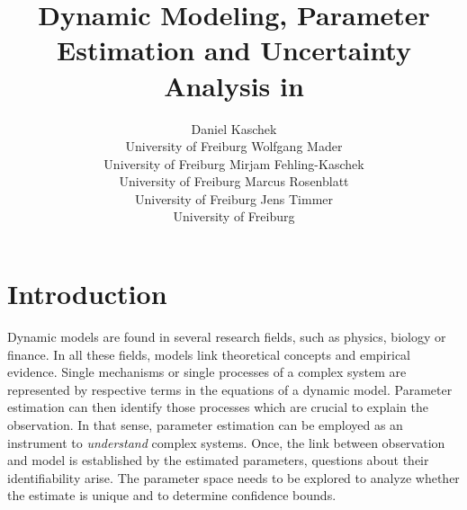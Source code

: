 \documentclass[article]{jss}
\author{Daniel Kaschek\\University of Freiburg \And
	Wolfgang Mader\\University of Freiburg \AND
	Mirjam Fehling-Kaschek\\University of Freiburg \And
	Marcus Rosenblatt\\University of Freiburg \And
	Jens Timmer\\University of Freiburg}
\title{Dynamic Modeling, Parameter Estimation and Uncertainty Analysis in \proglang{R}}
\begin{document}
\section{Introduction}
Dynamic models are found in several research fields, such as physics, biology or finance. In all these fields, models link theoretical concepts and empirical evidence.
Single mechanisms or single processes of a complex system are represented by respective terms in the equations of a dynamic model. Parameter estimation can then identify those processes which are crucial to explain the observation.
In that sense, parameter estimation can be employed as an instrument to \textit{understand} complex systems. Once, the link between observation and model is established by the estimated parameters, questions about their identifiability arise. The parameter space needs to be explored to analyze whether the estimate is unique and to determine confidence bounds.
\end{document}
